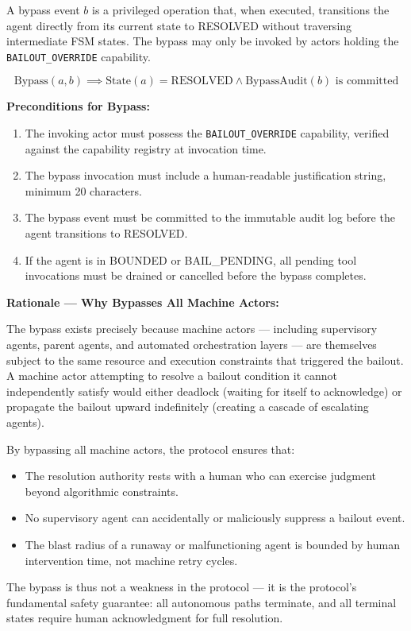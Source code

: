 \begin{definition}\label{def:bypass}
A bypass event $b$ is a privileged operation that, when executed, transitions the agent directly from its current state to RESOLVED without traversing intermediate FSM states. The bypass may only be invoked by actors holding the \texttt{BAILOUT\_OVERRIDE} capability.

\[
\text{Bypass}(a, b) \implies \text{State}(a) = \text{RESOLVED} \land \text{BypassAudit}(b) \text{ is committed}
\]

\bigskip
\textbf{Preconditions for Bypass:}
\begin{enumerate}
\item The invoking actor must possess the \texttt{BAILOUT\_OVERRIDE} capability, verified against the capability registry at invocation time.
\item The bypass invocation must include a human-readable justification string, minimum 20 characters.
\item The bypass event must be committed to the immutable audit log before the agent transitions to RESOLVED.
\item If the agent is in BOUNDED or BAIL\_PENDING, all pending tool invocations must be drained or cancelled before the bypass completes.
\end{enumerate}

\bigskip
\textbf{Rationale — Why Bypasses All Machine Actors:}

The bypass exists precisely because machine actors — including supervisory agents, parent agents, and automated orchestration layers — are themselves subject to the same resource and execution constraints that triggered the bailout. A machine actor attempting to resolve a bailout condition it cannot independently satisfy would either deadlock (waiting for itself to acknowledge) or propagate the bailout upward indefinitely (creating a cascade of escalating agents).

By bypassing all machine actors, the protocol ensures that:
\begin{itemize}
\item The resolution authority rests with a human who can exercise judgment beyond algorithmic constraints.
\item No supervisory agent can accidentally or maliciously suppress a bailout event.
\item The blast radius of a runaway or malfunctioning agent is bounded by human intervention time, not machine retry cycles.
\end{itemize}

The bypass is thus not a weakness in the protocol — it is the protocol's fundamental safety guarantee: all autonomous paths terminate, and all terminal states require human acknowledgment for full resolution.
\end{definition}

